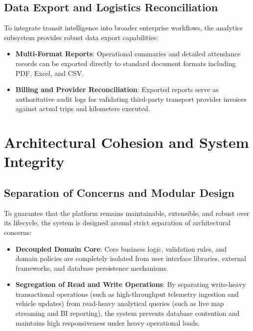 \subsection{Data Export and Logistics Reconciliation}
To integrate transit intelligence into broader enterprise workflows, the analytics subsystem provides robust data export capabilities:
\begin{itemize}
  \item \textbf{Multi-Format Reports}: Operational summaries and detailed attendance records can be exported directly to standard document formats including PDF, Excel, and CSV.
  \item \textbf{Billing and Provider Reconciliation}: Exported reports serve as authoritative audit logs for validating third-party transport provider invoices against actual trips and kilometers executed.
\end{itemize}

\section{Architectural Cohesion and System Integrity}
\label{sec:architectural_cohesion}

\subsection{Separation of Concerns and Modular Design}
To guarantee that the platform remains maintainable, extensible, and robust over its lifecycle, the system is designed around strict separation of architectural concerns:
\begin{itemize}
  \item \textbf{Decoupled Domain Core}: Core business logic, validation rules, and domain policies are completely isolated from user interface libraries, external frameworks, and database persistence mechanisms.
  \item \textbf{Segregation of Read and Write Operations}: By separating write-heavy transactional operations (such as high-throughput telemetry ingestion and vehicle updates) from read-heavy analytical queries (such as live map streaming and BI reporting), the system prevents database contention and maintains high responsiveness under heavy operational loads.
\end{itemize}

